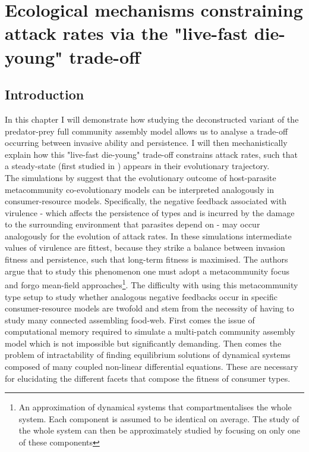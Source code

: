\documentclass[a4paper]{report}
\begin{document}
\chapter{Ecological mechanisms constraining attack rates via the "live-fast die-young" trade-off \label{ch:chapter_3}}

\section{Introduction}

In this chapter I will demonstrate how studying the deconstructed variant of the predator-prey full community assembly model allows us to analyse a trade-off occurring between invasive ability and persistence. I will then mechanistically explain how this "live-fast die-young" trade-off constrains attack rates, such that a steady-state (first studied in \citep{Rossberg2008}) appears in their evolutionary trajectory. \\

The simulations by \citep{Goodnight2008} suggest that the evolutionary outcome of host-parasite metacommunity co-evolutionary models can be interpreted analogously in consumer-resource models. Specifically, the negative feedback associated with virulence - which affects the persistence of types and is incurred by the damage to the surrounding environment that parasites depend on - may occur analogously for the evolution of attack rates. In these simulations intermediate values of virulence are fittest, because they strike a balance between invasion fitness and persistence, such that long-term fitness is maximised. The authors argue that to study this phenomenon one must adopt a metacommunity focus and forgo mean-field approaches\footnote{An approximation of dynamical systems that compartmentalises the whole system. Each component is assumed to be identical on average. The study of the whole system can then be approximately studied by focusing on only one of these components}. The difficulty with using this metacommunity type setup to study whether analogous negative feedbacks occur in specific consumer-resource models are twofold and stem from the necessity of having to study many connected assembling food-web. First comes the issue of computational memory required to simulate a multi-patch community assembly model which is not impossible but significantly demanding. Then comes the problem of intractability of finding equilibrium solutions of dynamical systems composed of many coupled non-linear differential equations. These are necessary for elucidating the different facets that compose the fitness of consumer types.\\
\end{document}
